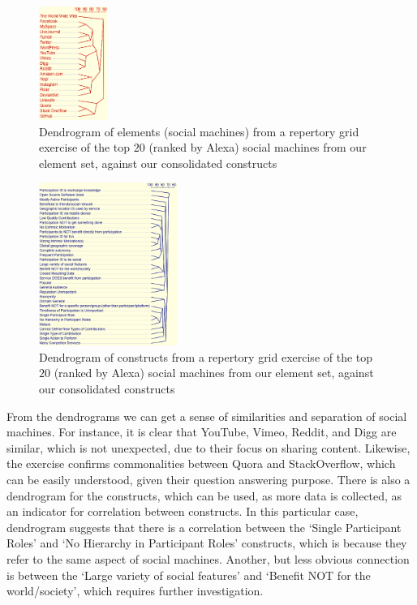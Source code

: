 \documentclass{sig-alternate}
\begin{document}
\begin{figure}[htb]
\begin{center}
\includegraphics[width=0.2\textwidth]{img/dendrogram-elements.png}
\caption{Dendrogram of elements (social machines) from a repertory grid exercise of the top $20$ (ranked by Alexa) social machines from our element set, against our consolidated constructs} \label{dendrogram}
\end{center}
\end{figure}

\begin{figure}[htb]
\begin{center}
\includegraphics[width=0.4\textwidth]{img/dendrogram-constructs.png}
\caption{Dendrogram of constructs from a repertory grid exercise of the top $20$ (ranked by Alexa) social machines from our element set, against our consolidated constructs} \label{dendrogram}
\end{center}
\end{figure}

From the dendrograms we can get a sense of similarities and separation of social machines. For
instance, it is clear that YouTube, Vimeo, Reddit, and Digg are similar, which is not unexpected, due to their focus on sharing content. Likewise, the exercise confirms commonalities between Quora and StackOverflow, which can be easily understood, given their question answering purpose. There is also a dendrogram for the constructs, which can be used, as more data is collected, as an indicator for correlation between constructs. In this particular case, dendrogram suggests that there is a correlation between the `Single Participant Roles' and `No Hierarchy in Participant Roles' constructs, which is because they refer to the same aspect of social machines. Another, but less obvious connection is between the `Large variety of social features' and `Benefit NOT for the world/society', which requires further investigation.
\end{document}
